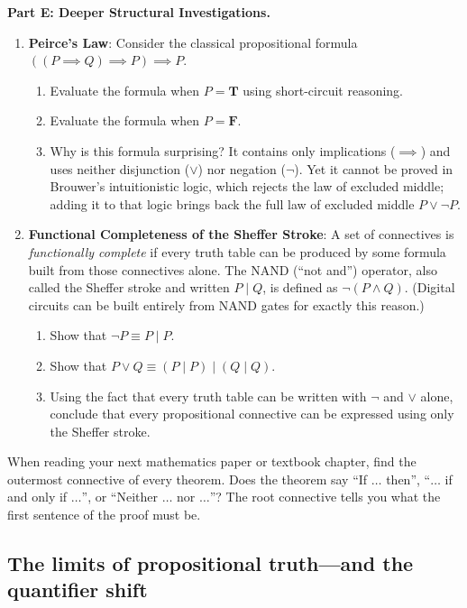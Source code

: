 \textbf{Part E: Deeper Structural Investigations.}
\begin{enumerate}[resume]
\item \textbf{Peirce's Law}: Consider the classical propositional formula $((P \implies Q) \implies P) \implies P$.
\begin{enumerate}
\item Evaluate the formula when $P = \mathbf{T}$ using short-circuit reasoning.
\item Evaluate the formula when $P = \mathbf{F}$.
\item Why is this formula surprising? It contains only implications ($\implies$) and uses neither disjunction ($\lor$) nor negation ($\neg$). Yet it cannot be proved in Brouwer's intuitionistic logic, which rejects the law of excluded middle; adding it to that logic brings back the full law of excluded middle $P \lor \neg P$.
\end{enumerate}
\item \textbf{Functional Completeness of the Sheffer Stroke}: A set of connectives is \emph{functionally complete} if every truth table can be produced by some formula built from those connectives alone. The NAND (``not and'') operator, also called the Sheffer stroke and written $P \mid Q$, is defined as $\neg(P \land Q)$. (Digital circuits can be built entirely from NAND gates for exactly this reason.)
\begin{enumerate}
\item Show that $\neg P \equiv P \mid P$.
\item Show that $P \lor Q \equiv (P \mid P) \mid (Q \mid Q)$.
\item Using the fact that every truth table can be written with $\neg$ and $\lor$ alone, conclude that every propositional connective can be expressed using only the Sheffer stroke.
\end{enumerate}
\end{enumerate}

\begin{walkbox}
When reading your next mathematics paper or textbook chapter, find the outermost connective of every theorem. Does the theorem say ``If $\dots$ then'', ``$\dots$ if and only if $\dots$'', or ``Neither $\dots$ nor $\dots$''? The root connective tells you what the first sentence of the proof must be.
\end{walkbox}

\subsection{The limits of propositional truth---and the quantifier shift}


